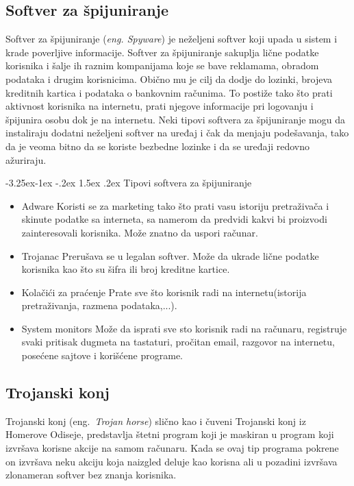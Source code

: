\documentclass[a4paper]{article}
\makeatletter
\renewcommand\paragraph{\@startsection{paragraph}{4}{\z@}%
   {-3.25ex\@plus -1ex \@minus -.2ex}%
   {1.5ex \@plus .2ex}%
   {\normalfont\normalsize\bfseries}}
\makeatother
\begin{document}
\subsection{Softver za špijuniranje}
\label{spyware}
Softver za špijuniranje (\textit{eng. Spyware}) je neželjeni softver koji upada u sistem  i krade poverljive informacije. Softver za špijuniranje sakuplja lične podatke korisnika i šalje ih raznim kompanijama koje se bave reklamama, obradom podataka i drugim korisnicima. Obično mu je cilj da dodje do lozinki, brojeva kreditnih kartica i podataka o bankovnim računima. 
To postiže tako što prati aktivnost korisnika na internetu, prati njegove informacije pri logovanju i špijunira osobu dok je na internetu. Neki tipovi softvera za špijuniranje mogu da instaliraju dodatni neželjeni softver na uređaj i čak da menjaju podešavanja, tako da je veoma bitno da se koriste bezbedne lozinke i da se uređaji redovno ažuriraju.\cite{spyware}

\paragraph{Tipovi softvera za špijuniranje}
\begin{itemize}
    \item Adware
    Koristi se za marketing tako što prati vasu istoriju pretraživača i skinute podatke sa interneta, sa 
    namerom da predvidi kakvi bi proizvodi zainteresovali korisnika.
    Može znatno da uspori računar.
    \item Trojanac
    Prerušava se u legalan softver. 
    Može da ukrade lične podatke korisnika kao što su šifra ili broj kreditne kartice.
    \item Kolačići za praćenje
    Prate sve što korisnik radi na internetu(istorija pretraživanja, razmena podataka,...).
    \item System monitors
    Može da isprati sve sto korisnik radi na računaru,
    registruje svaki pritisak dugmeta na tastaturi, pročitan email, razgovor na internetu, posećene sajtove i korišćene programe.   
\end{itemize}   

\subsection{Trojanski konj}

Trojanski konj (eng.~{\em Trojan horse}) slično kao i čuveni Trojanski konj iz Homerove Odiseje, predstavlja štetni program koji je maskiran u program koji izvršava korisne akcije na samom računaru. Kada se ovaj tip programa pokrene on izvršava neku akciju koja naizgled deluje kao korisna ali u pozadini izvršava zlonameran softver bez znanja korisnika. \cite{trojanhorse}
\end{document}
